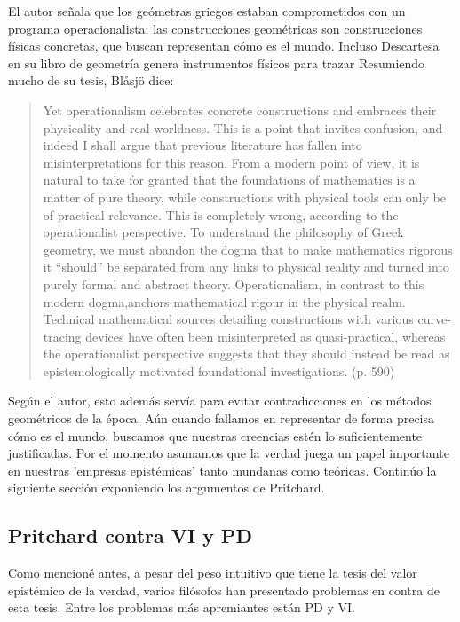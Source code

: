 {{{%
El autor señala que los geómetras griegos estaban comprometidos con un programa operacionalista: las construcciones geométricas son construcciones físicas concretas, que buscan representan cómo es el mundo.
Incluso Descartesa en su libro de geometría genera instrumentos físicos para trazar %
Resumiendo mucho de su tesis, Blåsjö dice:

\begin{quote}
    Yet operationalism celebrates concrete constructions and embraces their physicality and real-worldness. This is a point that invites confusion, and indeed I shall argue that previous literature has fallen into misinterpretations for this reason. From a modern point of view, it is natural to take for granted that the foundations of mathematics is a matter of pure theory, while constructions with physical tools can only be of practical relevance. This is completely wrong, according to the operationalist perspective. To understand the philosophy of Greek geometry, we must abandon the dogma that to make mathematics rigorous it “should” be separated from any links to physical reality and turned into purely formal and abstract theory. Operationalism, in contrast to this modern dogma,anchors mathematical rigour in the physical realm. Technical mathematical sources detailing constructions with various curve-tracing devices have often been misinterpreted as quasi-practical, whereas the operationalist perspective suggests that they should instead be read as epistemologically motivated foundational investigations. (p. 590)
\end{quote}

Según el autor, esto además servía para evitar contradicciones en los métodos geométricos de la época.
Aún cuando fallamos en representar de forma precisa cómo es el mundo, buscamos que nuestras creencias estén lo suficientemente justificadas.
Por el momento asumamos que la verdad juega un papel importante en nuestras 'empresas epistémicas' tanto mundanas como teóricas.
Continúo la siguiente sección exponiendo los argumentos de Pritchard.


\subsection{Pritchard contra VI y PD}

Como mencioné antes, a pesar del peso intuitivo que tiene la tesis del valor epistémico de la verdad, varios filósofos han presentado problemas en contra de esta tesis.
Entre los problemas más apremiantes están  PD y VI.

}}}

